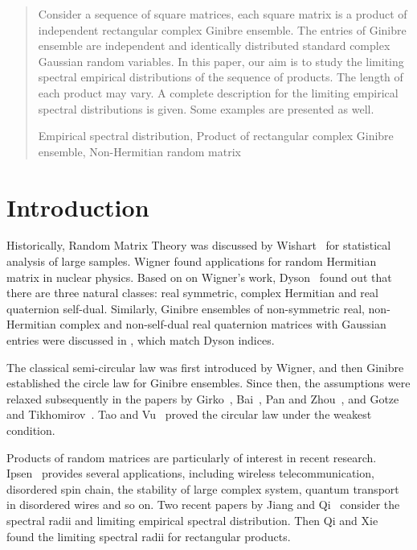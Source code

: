 \documentclass[12pt]{article}
\theoremstyle{plain}
\theoremstyle{definition}
\theoremstyle{remark}
\begin{document}
\begin{abstract}
Consider a sequence of square matrices, each square matrix is a
product of independent rectangular complex Ginibre ensemble. The
entries of Ginibre ensemble are independent and identically
distributed standard complex Gaussian random variables. In this
paper, our aim is to study the limiting spectral empirical
distributions of the sequence of products. The length of each
product may vary. A complete description for the limiting empirical
spectral distributions is given. Some
examples are presented as well. 

 Empirical spectral distribution, Product
of rectangular complex Ginibre ensemble, Non-Hermitian random matrix
\end{abstract}


\newpage
\tableofcontents

\newpage



\section{Introduction}\label{sec:intro}
Historically, Random Matrix Theory was discussed by Wishart~\cite{wishart} for statistical analysis of large samples.
Wigner found applications for random Hermitian matrix in nuclear
physics. Based on on Wigner's work, Dyson~\cite{Dyson} found out that
there are three natural classes: real symmetric, complex Hermitian
and real quaternion self-dual. Similarly, Ginibre ensembles of
non-symmetric real, non-Hermitian complex and non-self-dual real
quaternion matrices with Gaussian entries were discussed in
\cite{Ginibre}, which match Dyson indices.

The classical semi-circular law was first introduced by Wigner, and
then Ginibre~\cite{Ginibre} established the circle law for Ginibre
ensembles. Since then, the assumptions were relaxed subsequently in
the papers by Girko~\cite{Girko},  Bai~\cite{Bai},  Pan and
Zhou~\cite{Pan}, and Gotze and Tikhomirov~\cite{GF-TA}. Tao and
Vu~\cite{Tao} proved the circular law under the weakest condition.

Products of random matrices are particularly of interest in recent
research. Ipsen~\cite{Ipsen} provides several applications,
including wireless telecommunication, disordered spin chain, the
stability of large complex system, quantum transport in disordered
wires and so on. Two recent papers by Jiang and
Qi~\cite{JiangQi2019, 2017} consider the spectral radii and limiting
empirical spectral distribution. Then Qi and Xie~\cite{SRP} found
the limiting spectral radii for rectangular products.
\end{document}
